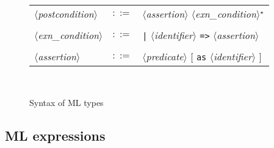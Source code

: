 \documentclass[a4paper,12pt]{report}
\makeatletter
\newcommand{\te}[1]{\texttt{#1}}
\newcommand{\nt}[1]{$\langle$\textsl{#1}$\rangle$}
\newcommand{\indexnt}[1]{\index{#1@\textsl{#1}, grammar entry}}
\newcommand{\etoile}{$^{\star}$}
\makeatother
\begin{document}
\begin{figure}[htbp]
\begin{center}
\begin{tabular}{lrl}
  \nt{postcondition}\indexnt{postcondition}
    & $::=$ & \nt{assertion} \nt{exn\_condition}\etoile \\
  \\[0.1em]

  \nt{exn\_condition} 
    & $::=$ & \te{|} \nt{identifier} \te{=>} \nt{assertion} \\
  \\[0.1em]

  \nt{assertion} 
    & $::=$ & \nt{predicate} $[$ \te{as} \nt{identifier} $]$ \\
\end{tabular}\\
\hrulefill
\caption{Syntax of ML types}
\label{fig:types}
\end{center}            
\end{figure}


\subsection{ML expressions}
\label{syntax:mlexpr}
\end{document}
